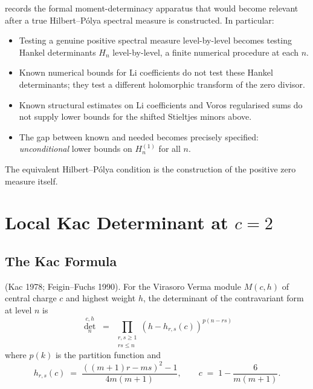\begin{remark}
\label{v4-arith:vb:rem:moment-gain}
 records the formal
moment-determinacy apparatus that would become relevant after a true
Hilbert--P\'olya spectral measure is constructed. In particular:
\begin{itemize}
\item Testing a genuine positive spectral measure level-by-level
becomes testing Hankel
determinants \(H_{n}\) level-by-level, a finite numerical procedure at
each \(n\).
\item Known numerical bounds for Li coefficients do not test these
Hankel determinants; they test a different holomorphic transform of the
zero divisor.
\item Known structural estimates on Li coefficients and Voros
regularised sums do not supply lower bounds for the shifted Stieltjes
minors above.
\item The gap between known and needed becomes precisely specified:
\emph{unconditional} lower bounds on \(H_{n}^{(1)}\) for all \(n\).
\end{itemize}
The equivalent Hilbert--P\'olya condition is the construction of the
positive zero measure itself.
\end{remark}

\section{Local Kac Determinant at \(c=2\)}
\label{v4-arith:vb:kac}

\subsection{The Kac Formula}
\label{v4-arith:vb:kac-formula}

\begin{theorem}
\label{v4-arith:vb:thm:kac-formula}
\ClaimStatusProvedElsewhere (Kac 1978; Feigin--Fuchs 1990). For the
Virasoro Verma module \(M(c,h)\) of central charge \(c\) and highest
weight \(h\), the determinant of the contravariant form at level \(n\)
is
\begin{equation}
\label{v4-arith:vb:eq:kac-det}
\det_{n}^{c,h}\;=\;\prod_{\substack{r,s\geq 1\\rs\leq n}}(h-h_{r,s}(c))^{p(n-rs)}
\end{equation}
where \(p(k)\) is the partition function and
\begin{equation}
h_{r,s}(c)\;=\;\frac{((m+1)r-ms)^{2}-1}{4m(m+1)},\qquad c\;=\;1-\frac{6}{m(m+1)}.
\end{equation}
\end{theorem}

